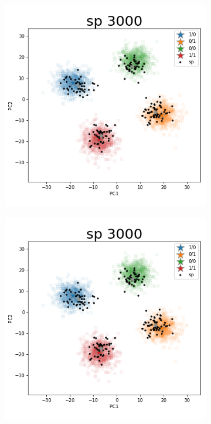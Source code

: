 \documentclass{article}
\begin{document}
\begin{figure}
\begin{subfigure}{.5\textwidth}
  \centering
  \includegraphics[width=.98\linewidth]{img/ggsim3000_100000_200_2_1_100_1_sturef_ggsim3000_100000_3000_2_1_100_0_sp}
\end{subfigure}%
\begin{subfigure}{.5\textwidth}
  \centering
  \includegraphics[width=.98\linewidth]{img/ggsim3000_100000_200_2_1_100_1_sturef_ggsim3000_100000_3000_2_1_100_0_sp}

\end{subfigure}
\end{figure}
\end{document}
